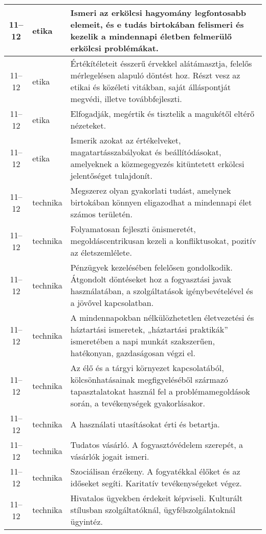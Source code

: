 \begin{small}
\begin{longtable}{c | p{2cm} |  p{11cm} }
              11--12 & etika & Ismeri az erkölcsi hagyomány legfontosabb elemeit, és e tudás birtokában felismeri és kezelik a mindennapi életben felmerülő erkölcsi problémákat. \\ \hline
              11--12 & etika & Értékítéleteit ésszerű érvekkel alátámasztja, felelős mérlegelésen alapuló döntést hoz. Részt vesz az etikai és közéleti vitákban, saját álláspontját megvédi, illetve továbbfejleszti. \\ \hline
              11--12 & etika & Elfogadják, megértik és tisztelik a magukétől eltérő nézeteket. \\ \hline
              11--12 & etika & Ismerik azokat az értékelveket, magatartásszabályokat és beállítódásokat, amelyeknek a közmegegyezés kitüntetett erkölcsi jelentőséget tulajdonít. \\ \hline
              11--12 & technika & Megszerez olyan gyakorlati tudást, amelynek birtokában könnyen eligazodhat a mindennapi élet számos területén. \\ \hline
              11--12 & technika & Folyamatosan fejleszti önismeretét, megoldáscentrikusan kezeli a konfliktusokat,  pozitív az életszemlélete. \\ \hline
              11--12 & technika & Pénzügyek kezelésében felelősen gondolkodik. Átgondolt döntéseket hoz a fogyasztási javak használatában, a szolgáltatások igénybevételével és a jövővel kapcsolatban. \\ \hline
              11--12 & technika & A mindennapokban nélkülözhetetlen életvezetési és háztartási ismeretek, „háztartási praktikák” ismeretében a napi munkát szakszerűen, hatékonyan, gazdaságosan végzi el. \\ \hline
              11--12 & technika & Az élő és a tárgyi környezet kapcsolatából, kölcsönhatásainak megfigyeléséből származó tapasztalatokat használ fel a problémamegoldások során, a tevékenységek gyakorlásakor. \\ \hline
              11--12 & technika & A használati utasításokat érti és betartja. \\ \hline
              11--12 & technika & Tudatos vásárló. A fogyasztóvédelem szerepét, a vásárlók jogait ismeri. \\ \hline
              11--12 & technika & Szociálisan érzékeny. A fogyatékkal élőket és az időseket segíti. Karitatív tevékenységeket végez. \\ \hline
              11--12 & technika & Hivatalos ügyekben érdekeit képviseli. Kulturált stílusban szolgáltatóknál, ügyfélszolgálatoknál ügyintéz. \\ \hline

\end{longtable}
\end{small}
